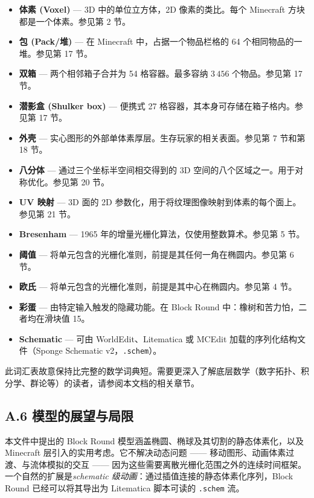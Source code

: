 \documentclass[12pt,a4paper]{scrartcl}
\newcommand{\code}[1]{\texttt{\small #1}}
\begin{document}
\begin{itemize}[leftmargin=1.4em,itemsep=0.18em,topsep=0.3em]
  \item \textbf{体素 (Voxel)} --- 3D 中的单位立方体，2D 像素的类比。每个 Minecraft 方块都是一个体素。参见第 2 节。
  \item \textbf{包 (Pack/堆)} --- 在 Minecraft 中，占据一个物品栏格的 64 个相同物品的一堆。参见第 17 节。
  \item \textbf{双箱} --- 两个相邻箱子合并为 54 格容器。最多容纳 $3\,456$ 个物品。参见第 17 节。
  \item \textbf{潜影盒 (Shulker box)} --- 便携式 27 格容器，其本身可存储在箱子格内。参见第 17 节。
  \item \textbf{外壳} --- 实心图形的外部单体素厚层。生存玩家的相关表面。参见第 7 节和第 18 节。
  \item \textbf{八分体} --- 通过三个坐标半空间相交得到的 3D 空间的八个区域之一。用于对称优化。参见第 20 节。
  \item \textbf{UV 映射} --- 3D 面的 2D 参数化，用于将纹理图像映射到体素的每个面上。参见第 21 节。
  \item \textbf{Bresenham} --- 1965 年的增量光栅化算法，仅使用整数算术。参见第 5 节。
  \item \textbf{阈值} --- 将单元包含的光栅化准则，前提是其任何一角在椭圆内。参见第 6 节。
  \item \textbf{欧氏} --- 将单元包含的光栅化准则，前提是其中心在椭圆内。参见第 4 节。
  \item \textbf{彩蛋} --- 由特定输入触发的隐藏功能。在 Block Round 中：橡树和苦力怕，二者均在滑块值 15。
  \item \textbf{Schematic} --- 可由 WorldEdit、Litematica 或 MCEdit 加载的序列化结构文件（Sponge Schematic v2，\code{.schem}）。
\end{itemize}

此词汇表故意保持比完整的数学词典短。需要更深入了解底层数学（数字拓扑、积分学、群论等）的读者，请参阅本文档的相关章节。

\subsection*{A.6 模型的展望与局限}

本文件中提出的 Block Round 模型涵盖椭圆、椭球及其切割的静态体素化，以及 Minecraft 层引入的实用考虑。它不解决动态问题 —— 移动图形、动画体素过渡、与流体模拟的交互 —— 因为这些需要离散光栅化范围之外的连续时间框架。一个自然的扩展是\emph{schematic 级动画}：通过插值连接的静态体素化序列，Block Round 已经可以将其导出为 Litematica 脚本可读的 \code{.schem} 流。
\end{document}
